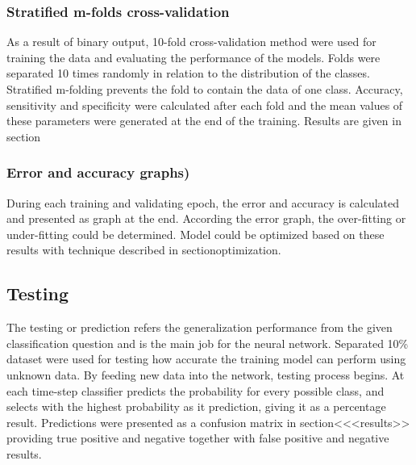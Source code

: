 \subsubsection{Stratified m-folds cross-validation}
As a result of binary output, 10-fold cross-validation method were used for training the data and evaluating the performance of the models. Folds were separated 10 times randomly in relation to the distribution of the classes. Stratified m-folding prevents the fold to contain the data of one class. Accuracy, sensitivity and specificity were calculated after each fold and the mean values of these parameters were generated at the end of the training. Results are given in section %

\subsubsection{Error and accuracy graphs)}
During each training and validating epoch, the error and accuracy is calculated and presented as graph at the end. According the error graph, the over-fitting or under-fitting could be determined. Model could be optimized based on these results with technique described in section{optimization}.

\subsection{Testing}
The testing or prediction refers the generalization performance from the given classification question and is the main job for the neural network.
Separated 10\% dataset were used for testing how accurate the training model can perform using unknown data. By feeding new data into the network, testing process begins. At each time-step classifier predicts the probability for every possible class, and selects with the highest probability as it prediction, giving it as a percentage result. Predictions were presented as a confusion matrix in section<<<results>> providing true positive and negative together with false positive and negative results.
